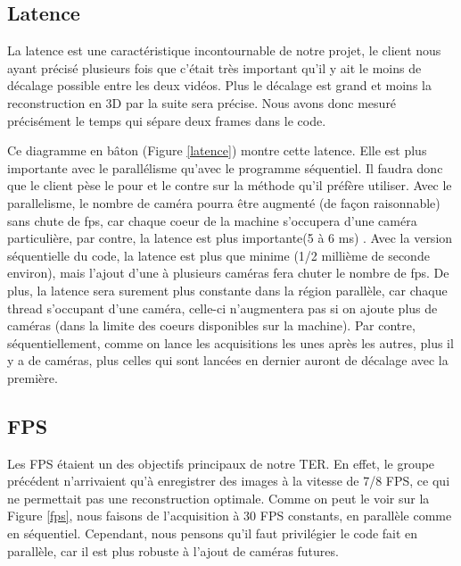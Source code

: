 \subsection{Latence}

La latence est une caractéristique incontournable de notre projet, le client nous ayant précisé plusieurs fois que c'était très important qu'il y ait le moins de décalage possible entre les deux vidéos. Plus le décalage est grand et moins la reconstruction en 3D par la suite sera précise. Nous avons donc mesuré précisément le temps qui sépare deux frames dans le code. 

Ce diagramme en bâton (Figure \ref{latence}) montre cette latence. Elle est plus importante avec le parallélisme qu'avec le programme séquentiel. Il faudra donc que le client pèse le pour et le contre sur la méthode qu'il préfère utiliser. Avec le parallelisme, le nombre de caméra pourra être augmenté (de façon raisonnable) sans chute de fps, car chaque coeur de la machine s'occupera d'une caméra particulière, par contre, la latence est plus importante(5 à 6 ms) . Avec la version séquentielle du code, la latence est plus que minime (1/2 millième de seconde environ), mais l'ajout d'une à plusieurs caméras fera chuter le nombre de fps.
De plus, la latence sera surement plus constante dans la région parallèle, car chaque thread s'occupant d'une caméra, celle-ci n'augmentera pas si on ajoute plus de caméras (dans la limite des coeurs disponibles sur la machine). Par contre, séquentiellement, comme on lance les acquisitions les unes après les autres, plus il y a de caméras, plus celles qui sont lancées en dernier auront de décalage avec la première.

\subsection{FPS}

Les FPS étaient un des objectifs principaux de notre TER. En effet, le groupe précédent n'arrivaient qu'à enregistrer des images à la vitesse de 7/8 FPS, ce qui ne permettait pas une reconstruction optimale. Comme on peut le voir sur la Figure \ref{fps}, nous faisons de l'acquisition à 30 FPS constants, en parallèle comme en séquentiel. Cependant, nous pensons qu'il faut privilégier le code fait en parallèle, car il est plus robuste à l'ajout de caméras futures.

